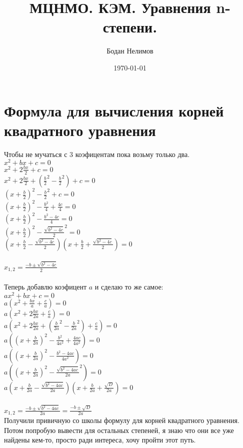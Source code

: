 \documentclass{article} %
\title{МЦНМО. КЭМ. Уравнения n-степени.}
\author{Бодан Нелимов}
\date{\today}
\begin{document}
	
	\maketitle
	\newpage
	
	\section{Формула для вычисления корней квадратного уравнения}{
		Чтобы не мучаться с $3$ коэфицентам пока возьму только два.\\
		$x^2+bx+c=0$\\
		$x^2+2\frac{bx}{2}+c=0$\\
		$x^2+2\frac{bx}{2}+(\frac{b}{2}^2-\frac{b}{2}^2)+c=0$\\
		$(x+\frac{b}{2})^2-\frac{b}{2}^2+c=0$\\
		$(x+\frac{b}{2})^2-\frac{b^2}{4}+\frac{4c}{4}=0$\\
		$(x+\frac{b}{2})^2-\frac{b^2-4c}{4}=0$\\
		$(x+\frac{b}{2})^2-\frac{\sqrt{b^2-4c}}{2}^2=0$\\
		$(x+\frac{b}{2}-\frac{\sqrt{b^2-4c}}{2})(x+\frac{b}{2}+\frac{\sqrt{b^2-4c}}{2})=0$\\\\
		$x_{1,2} = \frac{-b\pm\sqrt{b^2-4c}}{2}$\\\\
		Теперь добавлю коэфицент $a$ и сделаю то же самое:\\
		$ax^2+bx+c=0$\\
		$a(x^2+\frac{bx}{a}+\frac{c}{a})=0$\\
		$a(x^2+2\frac{bx}{2a}+\frac{c}{a})=0$\\
		$a(x^2+2\frac{bx}{2a}+(\frac{b}{2a}^2 - \frac{b}{2a}^2)+\frac{c}{a})=0$\\
		$a((x+\frac{b}{2a})^2 - \frac{b^2}{4a^2} + \frac{4ac}{4a^2})=0$\\
		$a((x+\frac{b}{2a})^2 - \frac{b^2-4ac}{4a^2})=0$\\
		$a((x+\frac{b}{2a})^2 - \frac{\sqrt{b^2-4ac}}{2a}^2)=0$\\
		$a(x+\frac{b}{2a} - \frac{\sqrt{b^2-4ac}}{2a})(x+\frac{b}{2a} + \frac{\sqrt{D}}{2a})=0$\\\\
		$x_{1,2} = \frac{-b\pm\sqrt{b^2-4ac}}{2a} = \frac{-b\pm\sqrt{D}}{2a}$\\
		Получили привичную со школы формулу для корней квадратного уравнения. Потом попробую вывести для остальных степеней, я знаю что они все уже найдены кем-то, просто ради интереса, хочу пройти этот путь.
	}
\end{document}
